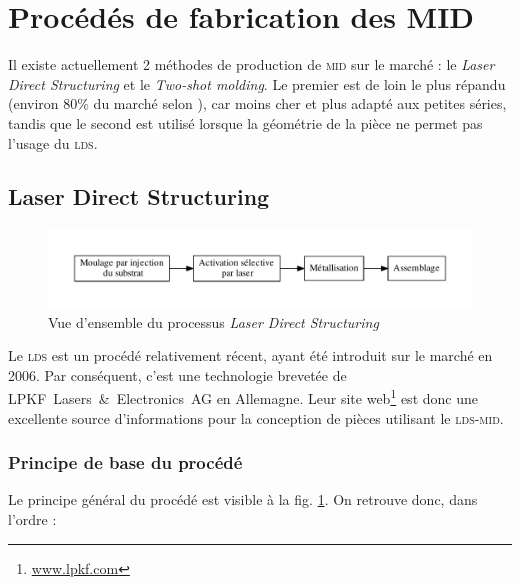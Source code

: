 \section{Procédés de fabrication des MID}
Il existe actuellement 2 méthodes de production de \textsc{mid} sur le marché : le \emph{Laser Direct Structuring} et le \emph{Two-shot molding}.
Le premier est de loin le plus répandu (environ 80\% du marché selon \cite{mid-2011}), car moins cher et plus adapté aux petites séries, tandis que le second est utilisé lorsque la géométrie de la pièce ne permet pas l'usage du \textsc{lds}.

\subsection{Laser Direct Structuring}
\begin{figure}[h]
    \begin{center}
        \includegraphics[width=\textwidth]{images/lds_process}
        \caption{Vue d'ensemble du processus \emph{Laser Direct Structuring}}\label{fig:lds-process}
    \end{center}
\end{figure}
Le \textsc{lds} est un procédé relativement récent, ayant été introduit sur le marché en 2006.
Par conséquent, c'est une technologie brevetée de LPKF~Lasers~\&~Electronics~AG en Allemagne.
Leur site web\footnote{\url{www.lpkf.com}} est donc une excellente source d'informations pour la conception de pièces utilisant le \textsc{lds-mid}.

\subsubsection{Principe de base du procédé}
Le principe général du procédé est visible à la fig.
\ref{fig:lds-process}.
On retrouve donc, dans l'ordre :

